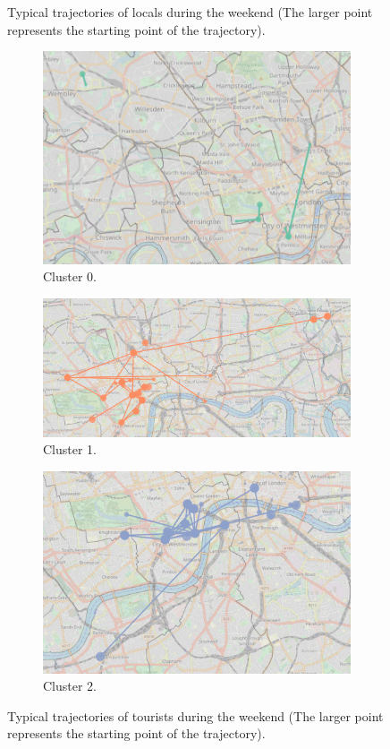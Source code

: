 \documentclass{article}
\theoremstyle{remark}
\begin{document}
\begin{figure}[!h]
\caption{Typical trajectories of locals during the weekend (The larger point represents the starting point of the trajectory).}
\label{fig:sequences_weekend_locals}
\end{figure}


\begin{figure}[!h]

\centering
\begin{subfigure}{0.6\textheight}
\centering
\includegraphics[width=0.4\linewidth]{figures/weekend_tourists_c0.png}
\caption{Cluster 0.}
\label{fig:weekend_tourists_c0}
\end{subfigure}
\begin{subfigure}{0.6\textheight}
\centering
\includegraphics[width=0.4\linewidth]{figures/weekend_tourists_c1.png}
\caption{Cluster 1.}
\label{fig:weekend_tourists_c1}
\end{subfigure}
\begin{subfigure}{0.6\textheight}
\centering
\includegraphics[width=0.4\linewidth]{figures/weekend_tourists_c2.png}
\caption{Cluster 2.}
\label{fig:weekend_tourists_c2}
\end{subfigure}

\caption{Typical trajectories of tourists during the weekend (The larger point represents the starting point of the trajectory).}
\label{fig:sequences_weekend_tourists}
\end{figure}

\end{document}
